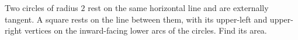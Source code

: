 Two circles of radius $2$ rest on the same horizontal line and are externally tangent. A square rests on the line between them, with its upper-left and upper-right vertices on the inward-facing lower arcs of the circles. Find its area.
